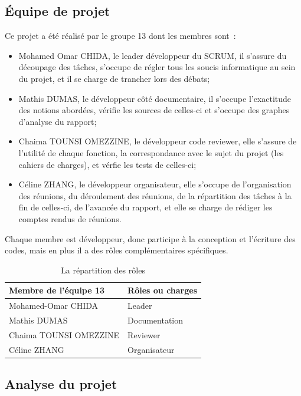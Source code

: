 \documentclass[12pt]{article}
\begin{document}
\subsection{Équipe de projet}
Ce projet a été réalisé par le groupe 13 dont les membres sont~:
\begin{itemize}
    \item Mohamed Omar CHIDA, le leader développeur du SCRUM, il s'assure du découpage des tâches, s'occupe de régler tous les soucis informatique au sein du projet, et il se charge de trancher lors des débats;
    \item Mathis DUMAS, le développeur côté documentaire, il s'occupe l'exactitude des notions abordées, vérifie les sources de celles-ci et s'occupe des graphes d'analyse du rapport;
    \item Chaima TOUNSI OMEZZINE, le développeur code reviewer, elle s'assure de l'utilité de chaque fonction, la correspondance avec le sujet du projet (les cahiers de charges), et vérfie les tests de celles-ci;
    \item Céline ZHANG, le développeur organisateur, elle s'occupe de l'organisation des réunions, du déroulement des réunions, de la répartition des tâches à la fin de celles-ci, de l'avancée du rapport, et elle se charge de rédiger les comptes rendus de réunions.
\end{itemize}
Chaque membre est développeur, donc participe à la conception et l'écriture des codes, mais en plus il a des rôles complémentaires spécifiques.
\begin{table}[!h]
\begin{center}
    \begin{tabular}{|l|l|}
    \hline
        Membre de l'équipe 13 & Rôles ou charges \\
    \hline
    \hline
        Mohamed-Omar CHIDA & Leader \\
    \hline
        Mathis DUMAS & Documentation \\
    \hline
        Chaima TOUNSI OMEZZINE & Reviewer \\
    \hline
        Céline ZHANG & Organisateur \\
    \hline
    \end{tabular}
\end{center}
\caption{La répartition des rôles}
\label{tab:roles}
\end{table}



\subsection{Analyse du projet}
\end{document}
